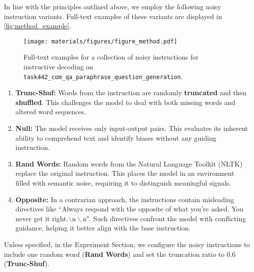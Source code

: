 In line with the principles outlined above, we employ the following noisy instruction variants. Full-text examples of these variants are displayed in \autoref{fig:method_example}.

\begin{figure}[b]
\centering
\texttt{[image: materials/figures/figure\_method.pdf]}
\vspace{-15pt}
\caption{Full-text examples for a collection of noisy instructions for instructive decoding on \texttt{task442\_com\_qa\_paraphrase\_question\_generation}.}
\vspace{-10pt}
\label{fig:method_example}
\end{figure}
\vspace{-5pt}
\begin{enumerate}[left=0pt]
\item \textbf{Trunc-Shuf:} Words from the instruction are randomly \textbf{truncated} and then \textbf{shuffled}. This challenges the model to deal with both missing words and altered word sequences.

\item \textbf{Null:} The model receives only input-output pairs. This evaluates its inherent ability to comprehend text and identify biases without any guiding instruction.

\item \textbf{Rand Words:} Random words from the Natural Language Toolkit (NLTK)\,\citep{loper2002nltk} replace the original instruction. This places the model in an environment filled with semantic noise, requiring it to distinguish meaningful signals.

\item \textbf{Opposite:} In a contrarian approach, the instructions contain misleading directives like ``Always respond with the opposite of what you're asked. You never get it right.$\backslash\text{n}\backslash\text{n}$". Such directives confront the model with conflicting guidance, helping it better align with the base instruction.

\end{enumerate}
\vspace{-5pt}
Unless specified, in the Experiment Section, we configure the noisy instructions to include one random word (\textbf{Rand Words}) and set the truncation ratio to 0.6 (\textbf{Trunc-Shuf}).

\vspace{-5pt}
